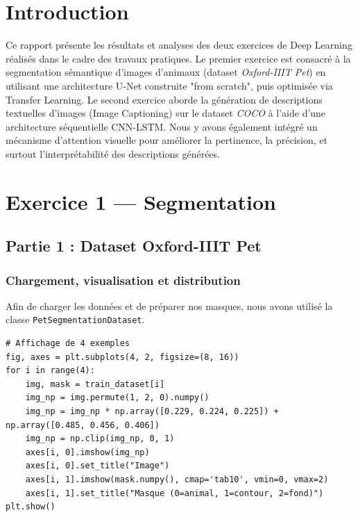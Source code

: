 \documentclass[12pt, a4paper]{article}
\begin{document}
\tableofcontents
\newpage

\section{Introduction}
Ce rapport présente les résultats et analyses des deux exercices de Deep Learning réalisés dans le cadre des travaux pratiques. Le premier exercice est consacré à la segmentation sémantique d'images d'animaux (dataset \textit{Oxford-IIIT Pet}) en utilisant une architecture U-Net construite "from scratch", puis optimisée via Transfer Learning. Le second exercice aborde la génération de descriptions textuelles d'images (Image Captioning) sur le dataset \textit{COCO} à l'aide d'une architecture séquentielle CNN-LSTM. Nous y avons également intégré un mécanisme d'attention visuelle pour améliorer la pertinence, la précision, et surtout l'interprétabilité des descriptions générées.

\newpage
\section{Exercice 1 — Segmentation}

\subsection{Partie 1 : Dataset Oxford-IIIT Pet}

\subsubsection*{Chargement, visualisation et distribution}
Afin de charger les données et de préparer nos masques, nous avons utilisé la classe \texttt{PetSegmentationDataset}.

\begin{lstlisting}
# Affichage de 4 exemples
fig, axes = plt.subplots(4, 2, figsize=(8, 16))
for i in range(4):
    img, mask = train_dataset[i]
    img_np = img.permute(1, 2, 0).numpy()
    img_np = img_np * np.array([0.229, 0.224, 0.225]) + np.array([0.485, 0.456, 0.406])
    img_np = np.clip(img_np, 0, 1)
    axes[i, 0].imshow(img_np)
    axes[i, 0].set_title("Image")
    axes[i, 1].imshow(mask.numpy(), cmap='tab10', vmin=0, vmax=2)
    axes[i, 1].set_title("Masque (0=animal, 1=contour, 2=fond)")
plt.show()
\end{lstlisting}
\end{document}
